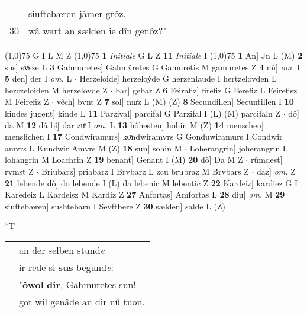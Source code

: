 \documentclass[8pt,a4paper,notitlepage]{article}
\begin{document}
\begin{table}[ht]
\begin{minipage}[t]{0.5\linewidth}
\begin{tabular}{rl}
 & siuftebæren jâmer grôz.\\ 
30 & wâ wart an sælden ie dîn genôz?"\\ 
\end{tabular}
\scriptsize
\line(1,0){75} \newline
G I L M Z \newline
\line(1,0){75} \newline
\textbf{1} \textit{Initiale} G L Z  \textbf{11} \textit{Initiale} I  \newline
\line(1,0){75} \newline
\textbf{1} An] Jn L (M) \textbf{2} sus] svͯsze L \textbf{3} Gahmuretes] Gahmv̂retes G Gamuretis M gamuretes Z \textbf{4} nû] \textit{om.} I \textbf{5} den] der I \textit{om.} L  $\cdot$ Herzeloide] herzeloẏde G herzenlaude I hertzelovden L herczeloiden M herzelovde Z  $\cdot$ bar] gebar Z \textbf{6} Feirafiz] firefiz G Ferefiz L Feirefisz M Feirefiz Z  $\cdot$ vêch] bvnt Z \textbf{7} sol] muͯz L (M) (Z) \textbf{8} Secundillen] Secuntillen I \textbf{10} kindes jugent] kinde L \textbf{11} Parzival] parcifal G Parzifal I (L) (M) parcifaln Z  $\cdot$ dô] da M \textbf{12} dâ bî] dar zuͦ I \textit{om.} L \textbf{13} hôhesten] hohin M (Z) \textbf{14} menschen] menslichen I \textbf{17} Condwiramurs] koͮndwiramvrs G Gonduwiramurs I Condwir amvrs L Kundwir Amvrs M (Z) \textbf{18} sun] sohin M  $\cdot$ Loherangrin] joherangrin L lohangrin M Loachrin Z \textbf{19} benant] Genant I (M) \textbf{20} dô] Da M Z  $\cdot$ rûmdest] rvmst Z  $\cdot$ Briubarz] priabarz I Brvbarz L zcu brubraz M Brvbars Z  $\cdot$ daz] \textit{om.} Z \textbf{21} lebende dô] do lebende I (L) da lebenic M lebentic Z \textbf{22} Kardeiz] kardiez G I Karedeiz L Kardeisz M Kardiz Z \textbf{27} Anfortas] Amfortas L \textbf{28} diu] \textit{om.} M \textbf{29} siuftebæren] sushtebarn I Sevftbere Z \textbf{30} sælden] salde L (Z) \newline
\end{minipage}
\hspace{0.5cm}
\begin{minipage}[t]{0.5\linewidth}
\small
\begin{center}*T
\end{center}
\begin{tabular}{rl}
 & an der selben stund\textit{e}\\ 
 & ir rede si \textbf{sus} begund\textit{e}:\\ 
 & "\textbf{ôwol} \textbf{dir}, Gahmuretes sun!\\ 
 & got wil genâde an dir nû tuon.\\ 

\end{tabular}
\end{minipage}
\end{table}
\end{document}
